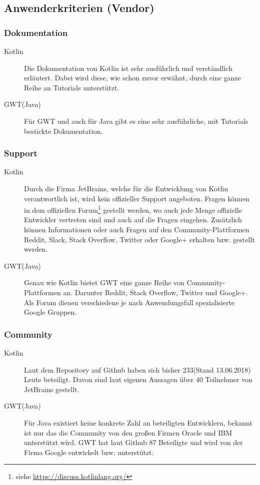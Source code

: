 \subsection{Anwenderkriterien (Vendor)}
\subsubsection{Dokumentation}
\begin{description}
	\item[Kotlin] Die Dokumentation von Kotlin ist sehr ausführlich und verständlich erläutert. Dabei wird diese, wie schon zuvor erwähnt, durch eine ganze Reihe an Tutorials unterstützt. \cite{kotlinReference}
	\item[GWT(Java)] Für \gls{GWT} und auch für Java gibt es eine sehr ausführliche, mit Tutorials bestickte Dokumentation. \cite{gwtDevGuide, javaDoc}
\end{description}

\subsubsection{Support}
\begin{description}
	\item[Kotlin] Durch die Firma JetBrains, welche für die Entwicklung von Kotlin verantwortlich ist, wird kein offizieller Support angeboten. Fragen können in dem offiziellen Forum\footnote{siehe \url{https://discuss.kotlinlang.org/}} gestellt werden, wo auch jede Menge offizielle Entwickler vertreten sind und auch auf die Fragen eingehen. Zusätzlich können Informationen oder auch Fragen auf den Community-Plattformen Reddit, Slack, Stack Overflow, Twitter oder Google+ erhalten bzw. gestellt werden. \cite{kotlinCommunity}
	\item[GWT(Java)] Genau wie Kotlin bietet \gls{GWT} eine ganze Reihe von Community-Plattformen an. Darunter Reddit, Stack Overflow, Twitter und Google+. Als Forum dienen verschiedene je nach Anwendungsfall spezialisierte Google Gruppen. \cite{gwtCommunity}
\end{description}

\subsubsection{Community}
\begin{description}
	\item[Kotlin] Laut dem Repository auf Github haben sich bisher 233(Stand 13.06.2018) Leute beteiligt. Davon sind laut eigenen Aussagen über 40 Teilnehmer von JetBrains gestellt. \cite{kotlinWhoDevelops}
	\item[GWT(Java)] Für Java existiert keine konkrete Zahl an beteiligten Entwicklern, bekannt ist nur das die Community von den großen Firmen Oracle und IBM unterstützt wird. \gls{GWT} hat laut Github 87 Beteiligte und wird von der Firma Google entwickelt bzw. unterstützt. \cite{oracleIBMCollaborate, gwtTerms}
\end{description}


